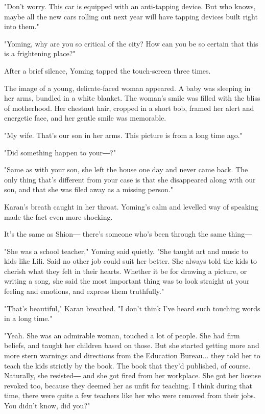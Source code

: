 "Don't worry. This car is equipped with an anti-tapping device. But who
knows, maybe all the new cars rolling out next year will have tapping
devices built right into them."

"Yoming, why are you so critical of the city? How can you be so certain
that this is a frightening place?"

After a brief silence, Yoming tapped the touch-screen three times.

The image of a young, delicate-faced woman appeared. A baby was sleeping
in her arms, bundled in a white blanket. The woman's smile was filled
with the bliss of motherhood. Her chestnut hair, cropped in a short bob,
framed her alert and energetic face, and her gentle smile was memorable.

"My wife. That's our son in her arms. This picture is from a long time
ago."

"Did something happen to your―?"

"Same as with your son, she left the house one day and never came back.
The only thing that's different from your case is that she disappeared
along with our son, and that she was filed away as a missing person."

Karan's breath caught in her throat. Yoming's calm and levelled way of
speaking made the fact even more shocking.

It's the same as Shion― there's someone who's been through the same
thing―

"She was a school teacher," Yoming said quietly. "She taught art and
music to kids like Lili. Said no other job could suit her better. She
always told the kids to cherish what they felt in their hearts. Whether
it be for drawing a picture, or writing a song, she said the most
important thing was to look straight at your feeling and emotions, and
express them truthfully."

"That's beautiful," Karan breathed. "I don't think I've heard such
touching words in a long time."

"Yeah. She was an admirable woman, touched a lot of people. She had firm
beliefs, and taught her children based on those. But she started getting
more and more stern warnings and directions from the Education Bureau...
they told her to teach the kids strictly by the book. The book that
they'd published, of course. Naturally, she resisted― and she got fired
from her workplace. She got her license revoked too, because they deemed
her as unfit for teaching. I think during that time, there were quite a
few teachers like her who were removed from their jobs. You didn't know,
did you?"

